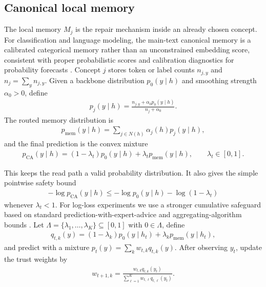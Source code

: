 \subsection{Canonical local memory}

\begin{definition}
\label{def:calibrated-categorical-memory}
The local memory $M_j$ is the repair mechanism inside an already chosen concept. For classification and language modeling, the main-text canonical memory is a calibrated categorical memory rather than an unconstrained embedding score, consistent with proper probabilistic scores and calibration diagnostics for probability forecasts \citep{brier1950verification,gneiting2007strictly,guo2017calibration}. Concept $j$ stores token or label counts $n_{j,y}$ and $n_j=\sum_y n_{j,y}$. Given a backbone distribution $p_0(y\mid h)$ and smoothing strength $\alpha_0>0$, define
\begin{align*}
p_j(y\mid h)
=
\frac{n_{j,y}+\alpha_0 p_0(y\mid h)}
{n_j+\alpha_0}.
\end{align*}
The routed memory distribution is
\begin{align*}
p_{\mathrm{mem}}(y\mid h)
=
\sum_{j\in N(h)}\alpha_j(h)p_j(y\mid h),
\end{align*}
and the final prediction is the convex mixture
\begin{align*}
p_{\mathrm{CA}}(y\mid h)
=
(1-\lambda_t)p_0(y\mid h)+\lambda_t p_{\mathrm{mem}}(y\mid h),
\qquad
\lambda_t\in[0,1].
\end{align*}
\end{definition}
This keeps the read path a valid probability distribution. It also gives the simple pointwise safety bound
\begin{align*}
-\log p_{\mathrm{CA}}(y\mid h)
\le
-\log p_0(y\mid h)-\log(1-\lambda_t)
\end{align*}
whenever $\lambda_t<1$. For log-loss experiments we use a stronger cumulative safeguard based on standard prediction-with-expert-advice and aggregating-algorithm bounds \citep{vovk1990aggregating,freund1997decision,cesabianchi2006prediction}. Let $\Lambda=\{\lambda_1,\ldots,\lambda_K\}\subseteq[0,1]$ with $0\in\Lambda$, define
\begin{align*}
q_{t,k}(y)
=
(1-\lambda_k)p_0(y\mid h_t)+\lambda_k p_{\mathrm{mem}}(y\mid h_t),
\end{align*}
and predict with a mixture $p_t(y)=\sum_k w_{t,k}q_{t,k}(y)$. After observing $y_t$, update the trust weights by
\begin{align}
w_{t+1,k}
=
\frac{w_{t,k}q_{t,k}(y_t)}
{\sum_{\ell=1}^K w_{t,\ell}q_{t,\ell}(y_t)}.
\label{eq:trust-weight-update}
\end{align}

